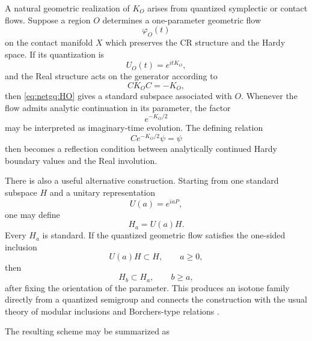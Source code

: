 \documentclass[a4paper,11pt]{article}
\theoremstyle{definition}
\begin{document}
A natural geometric realization of $K_O$ arises from quantized symplectic or
contact flows.  Suppose a region $O$ determines a one-parameter geometric
flow
\begin{equation}
    \varphi_O(t)
\end{equation}
on the contact manifold $X$ which preserves the CR structure and the Hardy
space.  If its quantization is
\begin{equation}
    U_O(t)
    =
    e^{itK_O},
\end{equation}
and the Real structure acts on the generator according to
\begin{equation}
    CK_OC=-K_O,
\end{equation}
then \eqref{eq:netgq:HO} gives a standard subspace associated with $O$.
Whenever the flow admits analytic continuation in its parameter, the factor
\begin{equation}
    e^{-K_O/2}
\end{equation}
may be interpreted as imaginary-time evolution.  The defining relation
\begin{equation}
    Ce^{-K_O/2}\psi=\psi
\end{equation}
then becomes a reflection condition between analytically continued Hardy
boundary values and the Real involution.

There is also a useful alternative construction.  Starting from one standard
subspace $H$ and a unitary representation
\begin{equation}
    U(a)=e^{iaP},
\end{equation}
one may define
\begin{equation}
    H_a=U(a)H.
\end{equation}
Every $H_a$ is standard.  If the quantized geometric flow satisfies the
one-sided inclusion
\begin{equation}
    U(a)H\subset H,
    \qquad
    a\geq0,
\end{equation}
then
\begin{equation}
    H_b\subset H_a,
    \qquad
    b\geq a,
\end{equation}
after fixing the orientation of the parameter.  This produces an isotone
family directly from a quantized semigroup and connects the construction with
the usual theory of modular inclusions and Borchers-type relations
\cite{BrunettiGuidoLongo2002,Longo2008}.

The resulting scheme may be summarized as
\begin{center}
\end{center}
\end{document}
